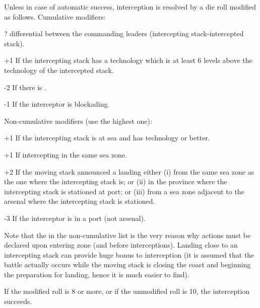 Unless in case of automatic success, interception is resolved by a die roll
modified as follows. Cumulative modifiers:
\begin{modlist}
\item[\textplusminus?] \Man differential between the commanding leaders
  (intercepting stack-intercepted stack).
\item[+1] If the intercepting stack has a technology which is at least 6
  levels above the technology of the intercepted stack.
\item[-2] If there is .
\item[-1] If the interceptor is blockading.
\end{modlist}
Non-cumulative modifiers (use the highest one):
\begin{modlist}
\item[+1] If the intercepting stack is at sea and has technology \TTD or
  better.
\item[+1] If intercepting in the same sea zone.
\item[+2] If the moving stack announced a landing either (i) from the same sea
  zone as the one where the intercepting stack is; or (ii) in the province
  where the intercepting stack is stationed at port; or (iii) from a sea zone
  adjacent to the arsenal where the intercepting stack is stationed.
\item[-3] If the interceptor is in a port (not arsenal).
\end{modlist}

Note that the  in the non-cumulative list is the very reason why
actions must be declared upon entering zone (and before
interceptions). Landing close to an intercepting stack can provide huge bonus
to interception (it is assumed that the battle actually occurs while the
moving stack is closing the coast and beginning the preparation for landing,
hence it is much easier to find).

If the modified roll is 8 or more, or if the unmodified roll is 10, the
interception succeeds.

